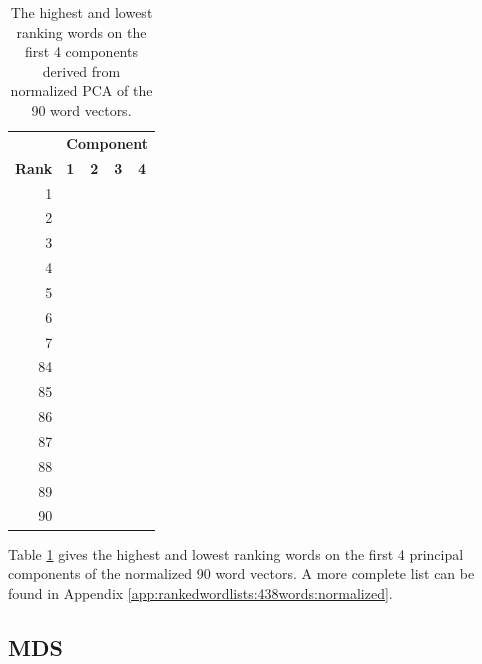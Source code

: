\documentclass[10pt,letterpaper]{book}
\begin{document}
\begin{table}[!htbp]
    \begin{tabular}{| rllll | }
        \hline
         & \multicolumn{4}{c|}{\textbf{Component}} \\
        \textbf{Rank} & \textbf{1} & \textbf{2} & \textbf{3} & \textbf{4} \\
        \hline
        1 &  &  &  &  \\
        2 &  &  &  &  \\
        3 &  &  &  &  \\
        4 &  &  &  &  \\
        5 &  &  &  &  \\
        6 &  &  &  &  \\
        7 &  &  &  &  \\
        \hline
        84 &  &  &  &  \\
        85 &  &  &  &  \\
        86 &  &  &  &  \\
        87 &  &  &  &  \\
        88 &  &  &  &  \\
        89 &  &  &  &  \\
        90 &  &  &  &  \\
        \hline
    \end{tabular}
    \caption{The highest and lowest ranking words on the first 4 components 
    derived from normalized PCA of the 90 word vectors.}
    \label{tab:438wordsRankingsNormalizedPCA}
\end{table}

Table \ref{tab:438wordsRankingsNormalizedPCA} gives the highest and lowest
ranking words on the first 4 principal components of the normalized 90 word 
vectors. A more complete list can be found in Appendix 
\ref{app:rankedwordlists:438words:normalized}.


\subsection{MDS}
\end{document}

